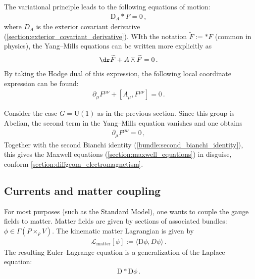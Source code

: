     The variational principle leads to the following equations of motion:
    \begin{gather}
        \label{gauge:YM_equation}
        \mathrm{D}_A\ast F = 0\,,
    \end{gather}
    where $D_A$ is the exterior covariant derivative (\cref{section:exterior_covariant_derivative}). WIth the notation $\widetilde{F}:=\ast F$ (common in physics), the Yang--Mills equations can be written more explicitly as
    \begin{gather}
        \dr\widetilde{F} + A\barwedge\widetilde{F} = 0\,.
    \end{gather}
    By taking the Hodge dual of this expression, the following local coordinate expression can be found:
    \begin{gather}
        \partial_\mu F^{\mu\nu} + [A_\mu,F^{\mu\nu}] = 0\,.
    \end{gather}
    
    \begin{example}[QED]
        Consider the case $G=\mathrm{U}(1)$ as in the previous section. Since this group is Abelian, the second term in the Yang--Mills equation vanishes and one obtains
        \begin{gather}
            \partial_\mu F^{\mu\nu} = 0\,,
        \end{gather}
        Together with the second Bianchi identity (\cref{bundle:second_bianchi_identity}), this gives the Maxwell equations (\cref{section:maxwell_equations}) in disguise, conform \cref{section:diffgeom_electromagnetism}.
    \end{example}


\subsection{Currents and matter coupling}

    For most purposes (such as the Standard Model), one wants to couple the gauge fields to matter. Matter fields are given by sections of associated bundles: $\phi\in\Gamma(P\times_\rho V)$. The kinematic matter Lagrangian is given by
    \begin{gather}
        \mathcal{L}_{\text{matter}}[\phi] := \langle\mathrm{D}\phi,D\phi\rangle\,.
    \end{gather}
    The resulting Euler--Lagrange equation is a generalization of the Laplace equation:
    \begin{gather}
        \mathrm{D}\ast\mathrm{D}\phi\,.
    \end{gather}

